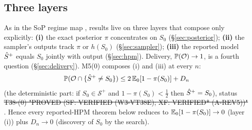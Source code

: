 \subsection{Three layers}
As in the SoP regime map , results live on three layers that compose only explicitly: \textbf{(i)} the exact posterior $\pi$ concentrates on $S_0$ (§\ref{sec:posterior}); \textbf{(ii)} the sampler's outputs track $\pi$ or $h(S_0)$ (§\ref{sec:sampler}); \textbf{(iii)} the reported model $\hat S^{+}$ equals $S_0$ jointly with output (§\ref{sec:hpm}). Delivery, $\mathbb P(\mathcal O)\to1$, is a fourth question (§\ref{sec:delivery}). M5(0) composes (i) and (iii) at every $n$:
\[
\mathbb P(\mathcal O\cap\{\hat S^{+}\ne S_0\})\le 2\,\mathbb E_0[1-\pi(S_0)]+D_n
\]
(the deterministic part: if $S_0\in\mathcal S^{+}$ and $1-\pi(S_0)<\frac12$ then $\hat S^{+}=S_0$), status \st{T38-(0) "PROVED (SF: VERIFIED (W3-VT38E); XF: VERIFIED* (A-REV5))"} . Hence every reported-HPM theorem below reduces to $\mathbb E_0[1-\pi(S_0)]\to0$ (layer (i)) plus $D_n\to0$ (discovery of $S_0$ by the search).
